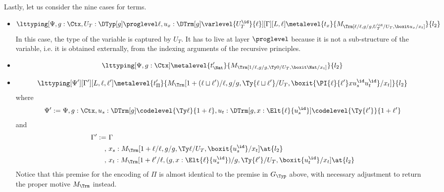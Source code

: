 Lastly, let us consider the nine cases for terms.
\begin{itemize}
\item
  \[
    \lttyping[\Psi, g : \Ctx,U_T : \DTyp[g] \proglevel \ell, u_x : \DTrm[g]\varlevel{U_T^\id}{\ell}][\Gamma][L,\ell]\metalevel{t_x}{M_\Trm[\ell/\ell,g/g,U_T^\id/U_T,\boxit u_x/x_t]}{l_2}
  \]
  In this case, the type of the variable is captured by $U_T$. %
  It has to live at layer $\proglevel$ because it is not a sub-structure of the variable,
  i.e. it is obtained externally, from the indexing arguments of the recursive principles. %
\item
  \[
    \lttyping[\Psi, g : \Ctx]\metalevel{t'_\Nat}{M_\Trm[1/\ell,g/g,\Ty 0/U_T,\boxit \Nat/x_t]}{l_2}    
  \]
\item
  \[
    \lttyping[\Psi'][\Gamma'][L,\ell,\ell']\metalevel{t'_\Pi}{M_\Trm[1 +{(\ell\sqcup \ell')}/\ell,g/g,\Ty{\ell\sqcup \ell'}/U_T,\boxit{\PI{\ell}{\ell'}x{u_s^\id}{u_t^\id}}/x_t]}{l_2}
  \]
  where
  \[
    \Psi' := \Psi, g : \Ctx,u_s : \DTrm[g] \codelevel {\Ty \ell}{1 + \ell},u_t :\DTrm[g,x:\Elt{\ell}{u_s^\id}]\codelevel{\Ty{\ell'}} {1 + \ell'}
  \]
  and
  \begin{align*}
    \Gamma' :=&~ \Gamma \\
    ,&~ x_s: M_\Trm[1 + \ell/\ell,g/g,\Ty \ell/U_T,\boxit{u_s^\id}/x_t] \at{l_2} \\
    ,&~ x_t:M_\Trm[1 + \ell'/\ell,(g,x:\Elt{\ell}{u_s^\id})/g,\Ty{\ell'}/U_T,\boxit{u_t^\id}/x_t]\at {l_2}
  \end{align*}
  Notice that this premise for the encoding of $\Pi$ is almost identical to the
  premise in $G_\Typ$ above, with necessary adjustment to return the proper motive
  $M_\Trm$ instead. %
  

\end{itemize}
